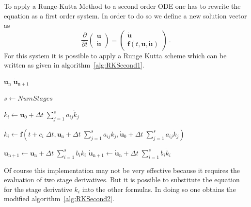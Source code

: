 To apply a Runge-Kutta Method to a second order ODE one has to rewrite the equation as a first order
system. In order to do so we define a new solution vector as
\begin{equation}
\frac{\partial}{\partial t} \left(  \begin{array}{c} \mathbf{u} \\ \mathbf{\dot{u}} \end{array} \right)
= \left( \begin{array}{c} \mathbf{\dot{u}} \\ \mathbf{f}(t,\mathbf{u},\mathbf{\dot{u}}) \end{array} \right)\ .
\end{equation}
For this system it is possible to apply a Runge Kutta scheme which can be written as given in
algorithm~\ref{alg:RKSecond1}.
\begin{algorithm}
\caption{Runge Kutta Scheme for Second order ODE (version 1)} \label{alg:RKSecond1}
\begin{algorithmic}
\REQUIRE $\mathbf{u}_{\mathrm{n}}$
\ENSURE  $\mathbf{\dot{u}}_{\mathrm{n}+1}$

\STATE $s \gets NumStages$

\STATE {}
\STATE $k_i \gets \mathbf{\dot{u}}_0 + \Delta t\; \sum_{j=1}^{s} a_{ij} \dot{k}_j$

\STATE $\dot{k}_i \gets \mathbf{f}(t+c_i\;\Delta t,\mathbf{u}_{\mathrm{n}} + \Delta t\;
\sum_{j=1}^{s} a_{ij} k_j, \mathbf{\dot{u}}_0 + \Delta t\; \sum_{j=1}^{s} a_{ij} \dot{k}_j)$
\ENDFOR

\STATE {}
\STATE $\mathbf{u}_{\mathrm{n}+1} \gets \mathbf{u}_{\mathrm{n}} + \Delta t\; \sum_{i=1}^s b_i k_i$
\STATE {}
\STATE $\mathbf{\dot{u}}_{\mathrm{n}+1} \gets \mathbf{\dot{u}}_{\mathrm{n}} + \Delta t\; \sum_{i=1}^s b_i \dot{k}_i$
\end{algorithmic}
\end{algorithm}
Of course this implementation may not be very effective because it requires the evaluation of two
stage derivatives. But it is possible to substitute the
equation for the stage derivative $k_i$ into the other formulas. In doing so one obtains the
modified algorithm~\ref{alg:RKSecond2}.

